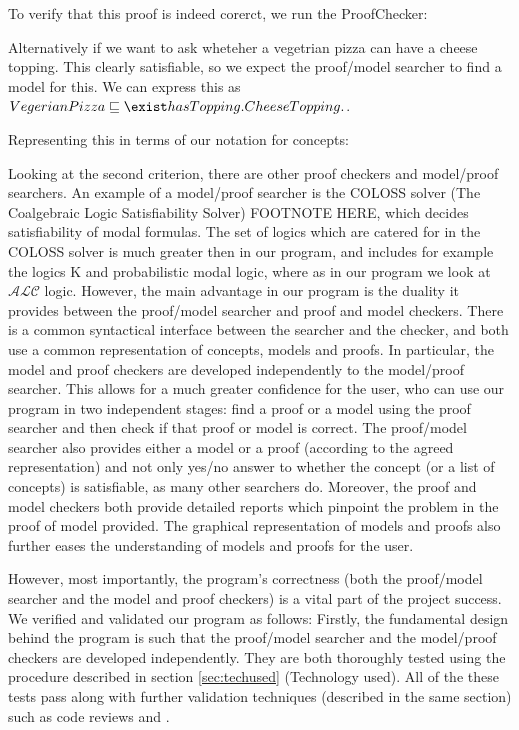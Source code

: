 To verify that this proof is indeed corerct, we run the ProofChecker:

Alternatively if we want to ask wheteher a vegetrian pizza can have a cheese topping. This clearly satisfiable, so we expect the proof/model searcher to find a model for this. We can express this as $VegerianPizza \sqsubseteq \exist hasTopping.CheeseTopping.$. 

Representing this in terms of our notation for concepts:

Looking at the second criterion, there are other proof checkers and model/proof searchers. An example of a model/proof searcher is the COLOSS solver (The Coalgebraic Logic Satisfiability Solver) FOOTNOTE HERE, which decides satisfiability of modal formulas. The set of logics which are catered for in the COLOSS solver is much greater then in our program, and includes for example the logics K and probabilistic modal logic, where as in our program we look at $\mathcal{ALC}$ logic. However, the main advantage in our program is the duality it provides between the proof/model searcher and proof and model checkers. There is a common syntactical interface between the searcher and the checker, and both use a common representation of concepts, models and proofs. In particular, the model and proof checkers are developed independently to the model/proof searcher. This allows for a much greater confidence for the user, who can use our program in two independent stages: find a proof or a model using the proof searcher and then check if that proof or model is correct. The proof/model searcher also provides either a model or a proof (according to the agreed representation) and not only yes/no answer to whether the concept (or a list of concepts) is satisfiable, as many other searchers do. Moreover, the proof and model checkers both provide detailed reports which pinpoint the problem in the proof of model provided. The graphical representation of models and proofs also further eases the understanding of models and proofs for the user.

However, most importantly, the program's correctness (both the proof/model searcher and the model and proof checkers) is a vital part of the project success. We verified and validated our program as follows: Firstly, the fundamental design behind the program is such that the proof/model searcher and the model/proof checkers are developed independently. They are both thoroughly tested using the procedure described in section \ref{sec:techused} (Technology used). All of the these tests pass along with further validation techniques (described in the same section) such as code reviews and .

